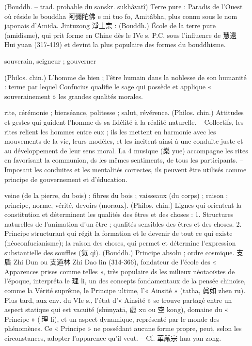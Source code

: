 \begin{Def}[jingtu 淨土]
    (Bouddh. – trad. probable du sanskr. sukhâvatî) Terre pure : Paradis de l’Ouest où réside le bouddha 阿彌陀佛 e mi tuo fo, Amitâbha, plus connu sous le nom japonais d’Amida.	Jintuzong 淨土宗 : (Bouddh.) École de la terre pure (amidisme), qui prit forme en Chine dès le IVe s. P.C. sous l’influence de 慧遠 Hui yuan (317-419) et devint la plus populaire des formes du bouddhisme. 
\end{Def}
\begin{Def}[jun 君]
    souverain, seigneur ; gouverner
\end{Def}
\begin{Def}[junzi 君子 ]
    (Philos. chin.) L’homme de bien ; l’être humain dans la noblesse de son humanité : terme par lequel Confucius qualifie le sage qui possède et applique « souverainement » les grandes qualités morales.	
\end{Def}
\begin{Def}[li禮 ]
     rite, cérémonie ; bienséance, politesse ; salut, révérence. (Philos. chin.) Attitudes et gestes qui guident l’homme ds sa fidélité à la réalité naturelle. – Collectifs, les rites relient les hommes entre eux ; ils les mettent en harmonie avec les mouvements de la vie, leurs modèles, et les incitent ainsi à une conduite juste et au développement de leur sens moral. La  4 musique (樂 yue) accompagne les rites en favorisant la communion, ds les mêmes sentiments, de tous les participants. – Imposant les conduites et les mentalités correctes, ils peuvent être utilisés comme principe de gouvernement et d’éducation. 
\end{Def}
\begin{Def}[li 理 ]
    veine (de la pierre, du bois) ; fibres du bois ; vaisseaux (du corps) ; raison ; principe, norme, vérité, devoirs (moraux). (Philos. chin.) Lignes qui orientent la constitution et déterminent les qualités des êtres et des choses : 1. Structures naturelles de l’animation d’un être ; qualités sensibles des êtres et des choses. 2. Principe structurant qui régit la formation et le devenir de tout ce qui existe (néoconfucianisme); la raison des choses, qui permet et détermine l’expression substantielle des souffles (氣 qì). (Bouddh.) Principe absolu ; ordre cosmique. 支盾 Zhi Dun ou 支道林 Zhi Dao lin (314-366), fondateur de l’école des « Apparences prises comme telles », très populaire ds les milieux néotaoïstes de l’époque, interpréta le 理 li, un des concepts fondamentaux de la pensée chinoise, comme la Vérité suprême, le Principe ultime, l’« Ainsité » (tathā, 眞如 zhen ru). Plus tard, aux env. du VIe s., l’état d’« Ainsité » se trouve partagé entre un aspect statique qui est vacuité (shūnyatā, 虛 xu ou 空 kong), domaine du « Principe » ( 理 li), et un aspect dynamique, représenté par le monde des phénomènes. Ce « Principe » ne possédant aucune forme propre, peut, selon les circonstances, adopter l’apparence qu’il veut. – Cf. 華嚴宗 hua yan zong.
\end{Def}
